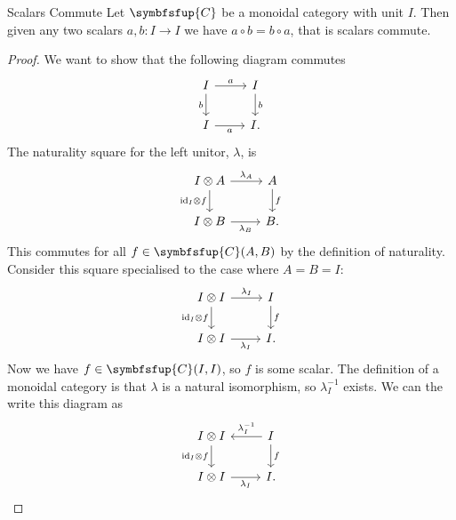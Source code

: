 \documentclass[fleqn]{NotesClass}
\newcommand{\cat}[1]{\symbfsfup{#1}}
\DeclareMathOperator{\id}{id}
\begin{document}
    \begin{lma}{Scalars Commute}{}
        Let \(\cat{C}\) be a monoidal category with unit \(I\).
        Then given any two scalars \(a, b \colon I \to I\) we have \(a \circ b = b \circ a\), that is scalars commute.
        \begin{proof}
            We want to show that the following diagram commutes
            \begin{equation}
                \begin{tikzcd}
                    I \arrow[r, "a"] \arrow[d, "b"'] & I \arrow[d, "b"]\\
                    I \arrow[r, "a"'] & I.
                \end{tikzcd}
            \end{equation}
            The naturality square for the left unitor, \(\lambda\), is
            \begin{equation}
                \begin{tikzcd}
                    I \otimes A \arrow[r, "\lambda_A"] \arrow[d, "{\id_I} \otimes f"'] & A \arrow[d, "f"]\\
                    I \otimes B \arrow[r, "\lambda_B"'] & B.
                \end{tikzcd}
            \end{equation}
            This commutes for all \(f \in \cat{C}(A, B)\) by the definition of naturality.
            Consider this square specialised to the case where \(A = B = I\):
            \begin{equation}
                \begin{tikzcd}
                    I \otimes I \arrow[r, "\lambda_I"] \arrow[d, "{\id_I} \otimes f"'] & I \arrow[d, "f"]\\
                    I \otimes I \arrow[r, "\lambda_I"'] & I.
                \end{tikzcd}
            \end{equation}
            Now we have \(f \in \cat{C}(I, I)\), so \(f\) is some scalar.
            The definition of a monoidal category is that \(\lambda\) is a natural isomorphism, so \(\lambda_I^{-1}\) exists.
            We can the write this diagram as
            \begin{equation}
                \begin{tikzcd}
                    I \otimes I \arrow[d, "{\id_I} \otimes f"'] & I \arrow[l, "\lambda_I^{-1}"'] \arrow[d, "f"]\\
                    I \otimes I \arrow[r, "\lambda_I"'] & I.

\end{tikzcd}
\end{equation}
\end{proof}
\end{lma}
\end{document}
